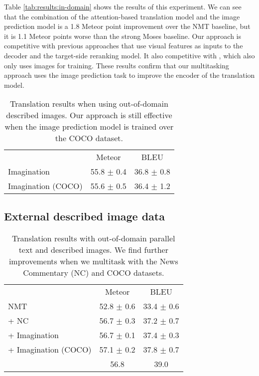 Table \ref{tab:results:in-domain} shows the results of this experiment.
We can see that the combination of the attention-based translation model and the image
prediction model is a 1.8 Meteor point improvement over the NMT
baseline, but it is 1.1 Meteor points worse than the strong Moses baseline. Our approach is competitive with previous approaches that use visual features as inputs to the decoder and the target-side reranking model. It also competitive with \cite{toyama2016neural}, which also only uses images for training.  These results confirm that our multitasking approach uses the image prediction task to improve the encoder of the translation model.

\begin{table}[t]
\centering
\renewcommand{\arraystretch}{1.3}
\begin{tabular}{lcc}
\cmidrule[0.08em](l{5pt}r{5pt}){1-3}
& Meteor & BLEU \\
\cmidrule(l{5pt}r{5pt}){1-3}
Imagination & 55.8 $\pm$ 0.4 & 36.8 $\pm$ 0.8 \\
Imagination (COCO) & 55.6 $\pm$ 0.5 & 36.4 $\pm$ 1.2 \\
\cmidrule[0.08em](l{5pt}r{5pt}){1-3}
\end{tabular}
\caption{Translation results when using out-of-domain described images. Our approach is still effective when the image prediction model is trained over the COCO dataset.}\label{tab:results:ood-coco}
\end{table}

\subsection{External described image data}\label{sec:experiments:ood-images}


\begin{table}
\centering
\renewcommand{\arraystretch}{1.3}
\begin{tabular}{@{}lcc}
\cmidrule[0.08em](l{1pt}r{5pt}){1-3}
 & Meteor & BLEU \\
\cmidrule(l{1pt}r{5pt}){1-3}
NMT & 52.8 $\pm$ 0.6 & 33.4 $\pm$ 0.6\\
+ NC & 56.7 $\pm$ 0.3 & 37.2 $\pm$ 0.7 \\
+ Imagination & 56.7 $\pm$ 0.1 & 37.4 $\pm$ 0.3 \\
+ Imagination (COCO) & 57.1 $\pm$ 0.2 & 37.8 $\pm$ 0.7 \\
\cite{Calixto2017c} & 56.8 & 39.0 \\
\cmidrule[0.08em](l{1pt}r{5pt}){1-3}
\end{tabular}
	\caption{Translation results with out-of-domain parallel text and described images. We find further improvements when we multitask with the News Commentary (NC) and COCO datasets.}\label{tab:results:ood-both}
\end{table}

